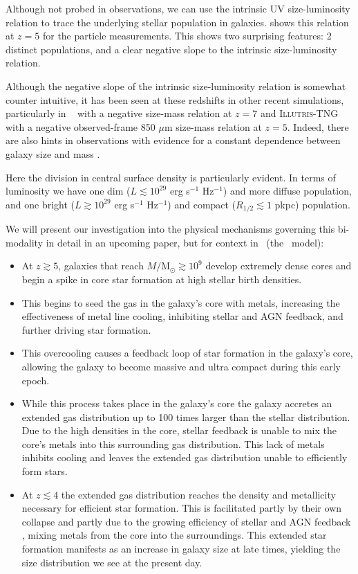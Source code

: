 Although not probed in observations, we can use the intrinsic UV size-luminosity relation to trace the underlying stellar population in galaxies.  shows this relation at $z=5$ for the particle measurements. This shows two surprising features: 2 distinct populations, and a clear negative slope to the intrinsic size-luminosity relation. 

Although the negative slope of the intrinsic size-luminosity relation is somewhat counter intuitive, it has been seen at these redshifts in other recent simulations, particularly in \bluetides\ \citep{Marshall21} with a negative size-mass relation at $z=7$ and \textsc{Illutris-TNG} \citep{Popping2021} with a negative observed-frame 850 $\mu$m size-mass relation at $z=5$. Indeed, there are also hints in observations with evidence for a constant dependence between galaxy size and mass \citep{Lang_2014, Mosleh_2020}. 

Here the division in central surface density is particularly evident. In terms of luminosity we have one dim ($L\lesssim10^{29}$ erg s$^{-1}$ Hz$^{-1}$) and more diffuse population, and one bright ($L\gtrsim10^{29}$ erg s$^{-1}$ Hz$^{-1}$) and compact ($R_{1/2}\lesssim 1$ pkpc) population.

We will present our investigation into the physical mechanisms governing this bi-modality in detail in an upcoming paper, but for context in \flares\ (the \eagle\ model):
\begin{itemize}
    \item At $z\gtrsim5$, galaxies that reach $M/\mathrm{ M}_\odot\gtrsim10^9$ develop extremely dense cores and begin a spike in core star formation at high stellar birth densities.
    \item This begins to seed the gas in the galaxy's core with metals, increasing the effectiveness of metal line cooling, inhibiting stellar and AGN feedback, and further driving star formation. 
    \item This overcooling causes a feedback loop of star formation in the galaxy's core, allowing the galaxy to become massive and ultra compact during this early epoch. 
    \item While this process takes place in the galaxy's core the galaxy accretes an extended gas distribution up to 100 times larger than the stellar distribution. Due to the high densities in the core, stellar feedback is unable to mix the core's metals into this surrounding gas distribution. This lack of metals inhibits cooling and leaves the extended gas distribution unable to efficiently form stars.
    \item At $z\lesssim4$ the extended gas distribution reaches the density and metallicity necessary for efficient star formation. This is facilitated partly by their own collapse and partly due to the growing efficiency of stellar and AGN feedback \citep{crain_eagle_2015}, mixing metals from the core into the surroundings. This extended star formation manifests as an increase in galaxy size at late times, yielding the size distribution we see at the present day.
\end{itemize}


